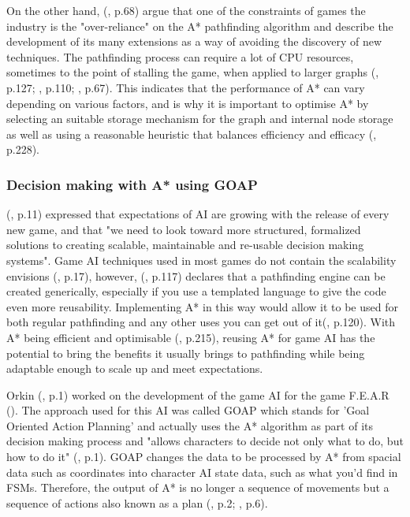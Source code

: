 \documentclass[10pt]{article}
\begin{document}
On the other hand, \citeauthor{graham2003pathfinding} (\citeyear{graham2003pathfinding}, p.68) argue that one of the constraints of games the industry is the "over-reliance" on the A* pathfinding algorithm and describe the development of its many extensions as a way of avoiding the discovery of new techniques. The pathfinding process can require a lot of CPU resources, sometimes to the point of stalling the game, when applied to larger graphs (\cite{cui2011based}, p.127; \cite{stentz1996map}, p.110; \cite{graham2003pathfinding}, p.67). This indicates that the performance of A* can vary depending on various factors, and is why it is important to optimise A* by selecting an suitable storage mechanism for the graph and internal node storage as well as using a reasonable heuristic that balances efficiency and efficacy (\cite{millington2019ai}, p.228).

\subsubsection{Decision making with A* using GOAP}

\citeauthor{orkin2003applying} (\citeyear{orkin2003applying}, p.11) expressed that expectations of AI are growing with the release of every new game, and that "we need to look toward more structured, formalized solutions to creating scalable, maintainable and re-usable decision making systems". Game AI techniques used in most games do not contain the scalability \citeauthor{orkin2003applying} envisions (\cite{laird2001human}, p.17), however, \citeauthor{higgins2002generic} (\citeyear{higgins2002generic}, p.117) declares that a pathfinding engine can be created generically, especially if you use a templated language to give the code even more reusability. Implementing A* in this way would allow it to be used for both regular pathfinding and any other uses you can get out of it(\cite{higgins2002generic}, p.120). With A* being efficient and optimisable (\cite{millington2019ai}, p.215), reusing A* for game AI has the potential to bring the benefits it usually brings to pathfinding while being adaptable enough to scale up and meet expectations.

Orkin (\citeyear{orkin2006three}, p.1) worked on the development of the game AI for the game F.E.A.R (\cite{FEAR}). The approach used for this AI was called GOAP which stands for 'Goal Oriented Action Planning' and actually uses the A* algorithm as part of its decision making process and "allows characters to decide not only what to do, but how to do it" (\cite{orkin2003applying}, p.1). GOAP changes the data to be processed by A* from spacial data such as coordinates into character AI state data, such as what you'd find in FSMs. Therefore, the output of A* is no longer a sequence of movements but a sequence of actions also known as a plan (\cite{orkin2003applying}, p.2; \cite{tozour2002evolution}, p.6).
\end{document}
